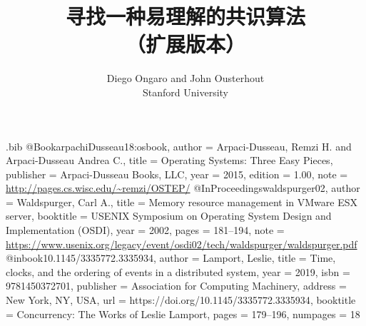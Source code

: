 \usepackage{filecontents}

\usepackage{CJKutf8}

\begin{filecontents}{\jobname.bib}
@Book{arpachiDusseau18:osbook,
  author =       {Arpaci-Dusseau, Remzi H. and Arpaci-Dusseau Andrea C.},
  title =        {Operating Systems: Three Easy Pieces},
  publisher =    {Arpaci-Dusseau Books, LLC},
  year =         2015,
  edition =      {1.00},
  note =         {\url{http://pages.cs.wisc.edu/~remzi/OSTEP/}}
}
@InProceedings{waldspurger02,
  author =       {Waldspurger, Carl A.},
  title =        {Memory resource management in {VMware ESX} server},
  booktitle =    {USENIX Symposium on Operating System Design and
                  Implementation (OSDI)},
  year =         2002,
  pages =        {181--194},
  note =         {\url{https://www.usenix.org/legacy/event/osdi02/tech/waldspurger/waldspurger.pdf}}}
@inbook{10.1145/3335772.3335934,
  author = {Lamport, Leslie},
  title = {Time, clocks, and the ordering of events in a distributed system},
  year = {2019},
  isbn = {9781450372701},
  publisher = {Association for Computing Machinery},
  address = {New York, NY, USA},
  url = {https://doi.org/10.1145/3335772.3335934},
  booktitle = {Concurrency: The Works of Leslie Lamport},
  pages = {179–196},
  numpages = {18}}
\end{filecontents}



\date{}

\title{\Large \bf 寻找一种易理解的共识算法\\
  （扩展版本）}

\author{
{\rm Diego Ongaro and John Ousterhout}\\
Stanford University
} %

